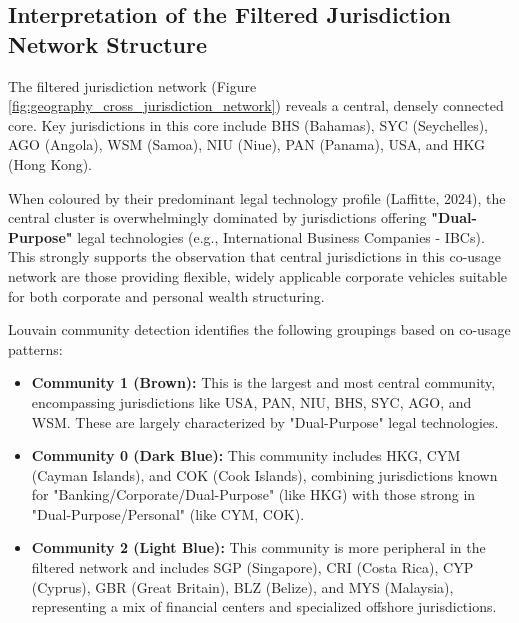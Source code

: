 \subsection{Interpretation of the Filtered Jurisdiction Network Structure}
The filtered jurisdiction network (Figure \ref{fig:geography_cross_jurisdiction_network}) reveals a central, densely connected core. Key jurisdictions in this core include BHS (Bahamas), SYC (Seychelles), AGO (Angola), WSM (Samoa), NIU (Niue), PAN (Panama), USA, and HKG (Hong Kong).

When coloured by their predominant legal technology profile (Laffitte, 2024), the central cluster is overwhelmingly dominated by jurisdictions offering \textbf{"Dual-Purpose"} legal technologies (e.g., International Business Companies - IBCs). This strongly supports the observation that central jurisdictions in this co-usage network are those providing flexible, widely applicable corporate vehicles suitable for both corporate and personal wealth structuring. 

Louvain community detection identifies the following groupings based on co-usage patterns:
\begin{itemize}
    \item \textbf{Community 1 (Brown):} This is the largest and most central community, encompassing jurisdictions like USA, PAN, NIU, BHS, SYC, AGO, and WSM. These are largely characterized by "Dual-Purpose" legal technologies.
    \item \textbf{Community 0 (Dark Blue):} This community includes HKG, CYM (Cayman Islands), and COK (Cook Islands), combining jurisdictions known for "Banking/Corporate/Dual-Purpose" (like HKG) with those strong in "Dual-Purpose/Personal" (like CYM, COK).
    \item \textbf{Community 2 (Light Blue):} This community is more peripheral in the filtered network and includes SGP (Singapore), CRI (Costa Rica), CYP (Cyprus), GBR (Great Britain), BLZ (Belize), and MYS (Malaysia), representing a mix of financial centers and specialized offshore jurisdictions.
\end{itemize}

